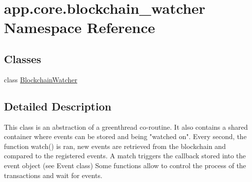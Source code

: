 \hypertarget{namespaceapp_1_1core_1_1blockchain__watcher}{}\section{app.\+core.\+blockchain\+\_\+watcher Namespace Reference}
\label{namespaceapp_1_1core_1_1blockchain__watcher}
\subsection*{Classes}
\begin{DoxyCompactItemize}
\item 
class \hyperlink{classapp_1_1core_1_1blockchain__watcher_1_1_blockchain_watcher}{Blockchain\+Watcher}
\end{DoxyCompactItemize}


\subsection{Detailed Description}
\begin{DoxyVerb}This class is an abstraction of a greenthread co-routine. It also contains a shared container where events can be stored and being "watched on".
Every second, the function watch() is ran, new events are retrieved from the blockchain and compared to the registered events. A match triggers the callback stored into the event object (see Event class)
Some functions allow to control the process of the transactions and wait for events.
\end{DoxyVerb}
 